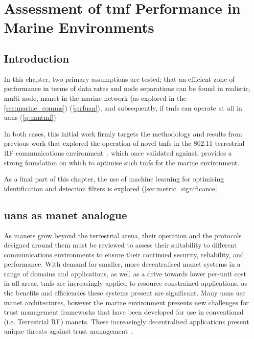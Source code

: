 
\chapter{Assessment of \gls{tmf} Performance in Marine Environments}
\label{ch:comms_trust}

\section{Introduction}

In this chapter, two primary assumptions are tested; that an efficient zone of performance in terms of data rates and node separations can be found in realistic, multi-node, \gls{manet} in the marine network (as explored in the \autoref{sec:marine_comms}) (\autoref{q:rfuan}), and subsequently, if \glspl{tmf} can operate at all in \glspl{uan} (\autoref{q:uantmf})

In both cases, this initial work firmly targets the methodology and results from previous work that explored the operation of novel \glspl{tmf} in the 802.11 terrestrial RF communications environment~\cite{Guo11}, which once validated against, provides a strong foundation on which to optimise such \glspl{tmf} for the marine environment.

As a final part of this chapter, the use of machine learning for optimising identification and detection filters is explored (\autoref{sec:metric_significance}

\section{\glspl{uan} as \gls{manet} analogue}\label{sec:rfuan}

As \glspl{manet} grow beyond the terrestrial arena, their operation and the protocols designed around them must be reviewed to assess their suitability to different communications environments to ensure their continued security, reliability, and performance.
With demand for smaller, more decentralised \gls{manet} systems in a range of domains and applications, as well as a drive towards lower per-unit cost in all areas, \glspl{tmf} are increasingly applied to resource constrained applications, as the benefits and efficiencies these systems present are significant.
Many \glspl{uan} use \gls{manet} architectures, however the marine environment presents new challenges for trust management frameworks that have been developed for use in conventional (i.e. Terrestrial RF) \glspl{manet}.
These increasingly decentralised applications present unique threats against trust management~\cite{Caiti2011}.

